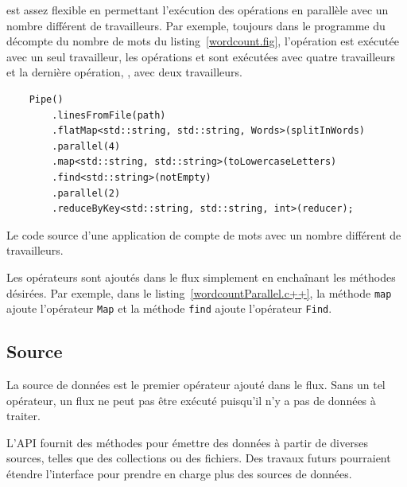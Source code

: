 \PpFf{} est assez flexible en permettant l'ex\'ecution des op\'erations en parall\`ele avec un nombre diff\'erent de travailleurs. Par exemple, toujours dans le programme du d\'ecompte du nombre de mots du listing~\ref{wordcount.fig}, l’opération  est exécutée avec un seul travailleur, les opérations  et  sont exécutées avec quatre travailleurs et la dernière opération, , avec deux travailleurs. 



\begin{Listing}[tbp]
\begin{lstlisting}
	Pipe()
		.linesFromFile(path) 
		.flatMap<std::string, std::string, Words>(splitInWords)
		.parallel(4)
		.map<std::string, std::string>(toLowercaseLetters)
		.find<std::string>(notEmpty)
		.parallel(2)
		.reduceByKey<std::string, std::string, int>(reducer);
\end{lstlisting}
\caption{Le code source d'une application de compte de mots avec un nombre diff\'erent de travailleurs.}
\label{wordcountParallel.c++}
\end{Listing}

Les op\'erateurs sont ajout\'es dans le flux simplement en encha\^inant les m\'ethodes d\'esir\'ees. Par exemple, dans le listing~\ref{wordcountParallel.c++}, la m\'ethode \texttt{map} ajoute l'opérateur \texttt{Map} et la m\'ethode \texttt{find} ajoute l'op\'erateur \texttt{Find}. 



\subsection{Source}

La source de donn\'ees est le premier op\'erateur ajout\'e dans le flux. Sans un tel op\'erateur, un flux ne peut pas \^etre ex\'ecut\'e puisqu'il n'y a pas de donn\'ees \`a traiter. 

L'API fournit des m\'ethodes pour \'emettre des donn\'ees \`a partir de diverses sources, telles que des collections ou des fichiers. Des travaux futurs pourraient \'etendre l'interface pour prendre en charge plus des sources de donn\'ees. 

